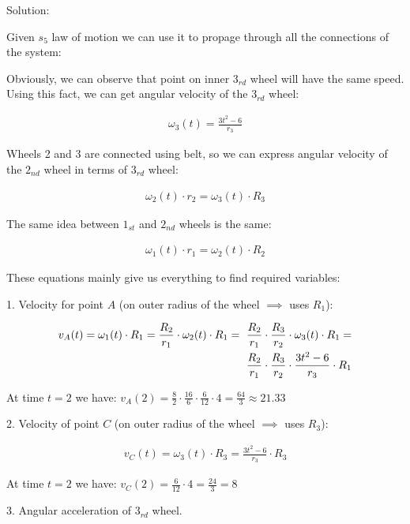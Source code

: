 \documentclass{article}
\begin{document}
Solution:

Given $s_5$ law of motion we can use it to propage through all the connections of the system:

Obviously, we can observe that point on inner $3_{rd}$ wheel will have the same speed.
Using this fact, we can get angular velocity of the $3_{rd}$ wheel:

\begin{align}
    \omega_3(t) = \frac{3t^2 - 6}{r_3}
\end{align}

Wheels 2 and 3 are connected using belt, so we can express angular velocity of the $2_{nd}$ wheel in terms of $3_{rd}$ wheel:

\begin{align}
    \omega_2(t) \cdot r_2 = \omega_3(t) \cdot R_3
\end{align}

The same idea between $1_{st}$ and $2_{nd}$ wheels is the same:

\begin{align}
    \omega_1(t) \cdot r_1 = \omega_2(t) \cdot R_2
\end{align}

These equations mainly give us everything to find required variables:

1. Velocity for point $A$ (on outer radius of the wheel $\implies$ uses $R_1$):

\begin{align}
    v_A(t) = \omega_1(t) \cdot R_1 = \frac{R_2}{r_1} \cdot \omega_2(t) \cdot {R_1} = \
    \frac{R_2}{r_1} \cdot \frac{R_3}{r_2} \cdot \omega_3(t) \cdot {R_1} = \notag \\
    \frac{R_2}{r_1} \cdot \frac{R_3}{r_2} \cdot \frac{3t^2 - 6}{r_3} \cdot {R_1}
\end{align}

At time $t = 2$ we have: $v_A(2) = \frac{8}{2} \cdot \frac{16}{6} \cdot \frac{6}{12} \cdot 4 = \frac{64}{3} \approx 21.33$

2. Velocity of point $C$ (on outer radius of the wheel $\implies$ uses $R_3$):

\begin{align}
    v_C(t) = \omega_3(t) \cdot R_3 = \frac{3t^2 - 6}{r_3} \cdot {R_3}
\end{align}

At time $t = 2$ we have: $v_C(2) = \frac{6}{12} \cdot 4 = \frac{24}{3} = 8$

3. Angular acceleration of $3_{rd}$ wheel.
\end{document}
